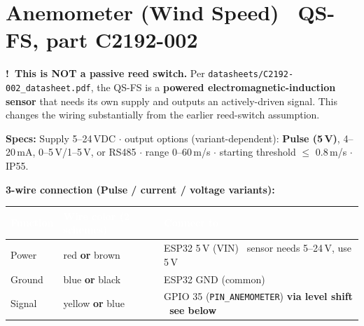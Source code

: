 \documentclass[11pt]{article}
\newcommand{\caution}{\textcolor{warnorange}{\textbf{!\ }}}
\newcommand{\tc}[1]{\textcolor{white}{\textbf{#1}}}   %
\newcommand{\nd}{\textrm{\textemdash}}                %
\begin{document}
\section*{Anemometer (Wind Speed) \nd\ QS-FS, part C2192-002}
\begin{warnbox}
\caution\textbf{This is NOT a passive reed switch.} Per
\texttt{datasheets/C2192-002\_datasheet.pdf}, the QS-FS is a \textbf{powered
electromagnetic-induction sensor} that needs its own supply and outputs an
actively-driven signal. This changes the wiring substantially from the earlier
reed-switch assumption.
\end{warnbox}

\noindent\textbf{Specs:} Supply 5--24\,VDC $\cdot$ output options
(variant-dependent): \textbf{Pulse (5\,V)}, 4--20\,mA, 0--5\,V/1--5\,V, or RS485
$\cdot$ range 0--60\,m/s $\cdot$ starting threshold $\le$ 0.8\,m/s $\cdot$ IP55.

\smallskip
\noindent\textbf{3-wire connection (Pulse / current / voltage variants):}

\smallskip
{}
\begin{xltabular}{\textwidth}{@{}P{2.2cm} P{4cm} L@{}}
\toprule
{}\tc{Function} & \tc{Wire color (2 schemes)} & \tc{Connect to}\\
\midrule\endhead
Power & red \textbf{or} brown & ESP32 5\,V (VIN) \nd\ sensor needs 5--24\,V, use 5\,V\\
Ground & blue \textbf{or} black & ESP32 GND (common)\\
Signal & yellow \textbf{or} blue & GPIO 35 (\texttt{PIN_ANEMOMETER})
  \textbf{via level shift \nd\ see below}\\
\bottomrule
\end{xltabular}
\end{document}
